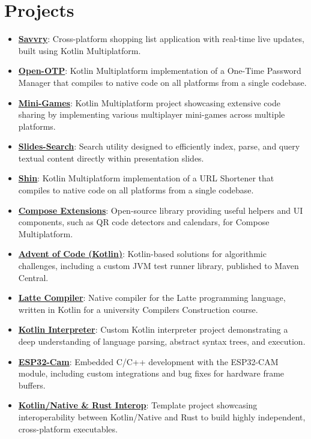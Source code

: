 \documentclass[letterpaper,11pt]{article}
\newcommand{\resumeItem}[2]{
  \item\small{
    \textbf{#1}{: #2 \vspace{-2pt}}
  }
}
\newcommand{\resumeSubItem}[2]{\resumeItem{#1}{#2}\vspace{-4pt}}
\newcommand{\resumeSubHeadingListStart}{\begin{itemize}[leftmargin=*]}
\newcommand{\resumeSubHeadingListEnd}{\end{itemize}}
\begin{document}
  \section{Projects}
    \resumeSubHeadingListStart
      \resumeSubItem{\href{https://github.com/avan1235/savvry}{Savvry}}
        {Cross-platform shopping list application with real-time live updates, built using Kotlin Multiplatform.}
      \resumeSubItem{\href{https://github.com/avan1235/open-otp}{Open-OTP}}
        {Kotlin Multiplatform implementation of a One-Time Password Manager that compiles to native code on all platforms from a single codebase.}
      \resumeSubItem{\href{https://github.com/avan1235/mini-games}{Mini-Games}}
        {Kotlin Multiplatform project showcasing extensive code sharing by implementing various multiplayer mini-games across multiple platforms.}
      \resumeSubItem{\href{https://github.com/avan1235/slides-search}{Slides-Search}}
        {Search utility designed to efficiently index, parse, and query textual content directly within presentation slides.}
      \resumeSubItem{\href{https://github.com/avan1235/shin}{Shin}}
        {Kotlin Multiplatform implementation of a URL Shortener that compiles to native code on all platforms from a single codebase.}
      \resumeSubItem{\href{https://github.com/avan1235/compose-extensions}{Compose Extensions}}
        {Open-source library providing useful helpers and UI components, such as QR code detectors and calendars, for Compose Multiplatform.}
      \resumeSubItem{\href{https://github.com/avan1235/advent-of-code-kotlin}{Advent of Code (Kotlin)}}
        {Kotlin-based solutions for algorithmic challenges, including a custom JVM test runner library, published to Maven Central.}
      \resumeSubItem{\href{https://github.com/avan1235/latte-compiler}{Latte Compiler}}
        {Native compiler for the Latte programming language, written in Kotlin for a university Compilers Construction course.}
      \resumeSubItem{\href{https://github.com/avan1235/kotlin-interpreter}{Kotlin Interpreter}}
        {Custom Kotlin interpreter project demonstrating a deep understanding of language parsing, abstract syntax trees, and execution.}
      \resumeSubItem{\href{https://github.com/avan1235/esp32-cam}{ESP32-Cam}}
        {Embedded C/C++ development with the ESP32-CAM module, including custom integrations and bug fixes for hardware frame buffers.}
      \resumeSubItem{\href{https://github.com/avan1235/kotlin-native-rust-interop}{Kotlin/Native \& Rust Interop}}
        {Template project showcasing interoperability between Kotlin/Native and Rust to build highly independent, cross-platform executables.}
    \resumeSubHeadingListEnd
\end{document}
